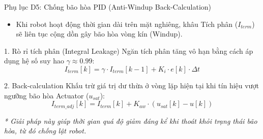 \documentclass[10pt,aspectratio=169]{beamer}
\begin{document}
\begin{frame}{Phụ lục D5: Chống bão hòa PID (Anti-Windup Back-Calculation)}
  \begin{itemize}
      \item Khi robot hoạt động thời gian dài trên mặt nghiêng, khâu Tích phân ($I_{term}$) sẽ liên tục cộng dồn gây bão hòa vòng kín (Windup).
  \end{itemize}
  \begin{block}{1. Rò rỉ tích phân (Integral Leakage)}
      Ngăn tích phân tăng vô hạn bằng cách áp dụng hệ số suy hao $\gamma \approx 0.99$:
      \begin{equation*}
          I_{term}[k] = \gamma \cdot I_{term}[k-1] + K_i \cdot e[k] \cdot \Delta t
      \end{equation*}
  \end{block}
  \begin{block}{2. Back-calculation}
      Khấu trừ giá trị dư thừa ở vòng lặp hiện tại khi tín hiệu vượt ngưỡng bão hòa Actuator ($u_{sat}$):
      \begin{equation*}
          I_{term\_adj}[k] = I_{term}[k] + K_{aw} \cdot \left( u_{sat}[k] - u[k] \right)
      \end{equation*}
  \end{block}
  {\small \textit{* Giải pháp này giúp thời gian quá độ giảm đáng kể khi thoát khỏi trạng thái bão hòa, từ đó chống lật robot.}}
\end{frame}
\end{document}
